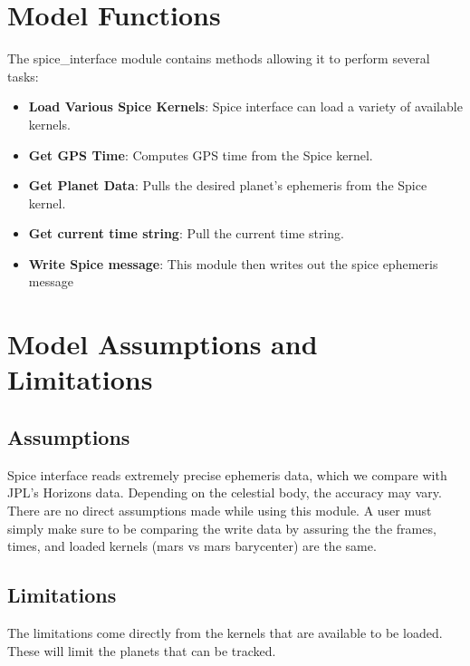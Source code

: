 \section{Model Functions}

The spice\_interface module contains methods allowing it to perform several tasks:

\begin{itemize}
	\item \textbf{Load Various Spice Kernels}: Spice interface can load a variety of available kernels.
	\item \textbf{Get GPS Time}: Computes GPS time from the Spice kernel.
	\item \textbf{Get Planet Data}: Pulls the desired planet's ephemeris from the Spice kernel.
	\item \textbf{Get current time string}: Pull the current time string.
	\item \textbf{Write Spice message}: This module then writes out the spice ephemeris message
\end{itemize}


\section{Model Assumptions and Limitations}

\subsection{Assumptions}

Spice interface reads extremely precise ephemeris data, which we compare with JPL's Horizons data. Depending on the celestial body, the accuracy may vary. 
There are no direct assumptions made while using this module. A user must simply make sure to be comparing the write data by assuring the the frames, times, and loaded kernels (mars vs mars barycenter) are the same.

\subsection{Limitations}

The limitations come directly from the kernels that are available to be loaded. These will limit the planets that can be tracked.